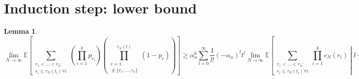 \documentclass{article}
\newtheorem{lemma}{Lemma}
\newcommand{\E}{\mathbb{E}}
\newcommand{\1}[1]{\mathbbm{1}_{#1}}
\begin{document}
\section*{Induction step: lower bound}

\begin{lemma}
\begin{equation}
\lim_{N\to\infty} \E \left[ \sum_{\substack{r_1 <\dots< r_k :\\ r_i \leq \tau_N(t_i) \forall i}}
\left( \prod_{i=1}^k p_{r_i} \right)
\left( \prod_{\substack{r=1 \\ \notin \{r_1,\dots,r_k\} }}^{\tau_N(t)} (1-p_r) \right) \right]
\geq \alpha_n^k \sum_{l=0}^\infty \frac{1}{l!} (-\alpha_n)^l t^l \lim_{N\to\infty} 
\E \left[ \sum_{\substack{r_1 <\dots< r_k :\\ r_i \leq \tau_N(t_i) \forall i}} \prod_{i=1}^k c_N(r_i) \middle| l+k \leq \tau_N(t) \right] .
\end{equation}
\end{lemma}
\end{document}
